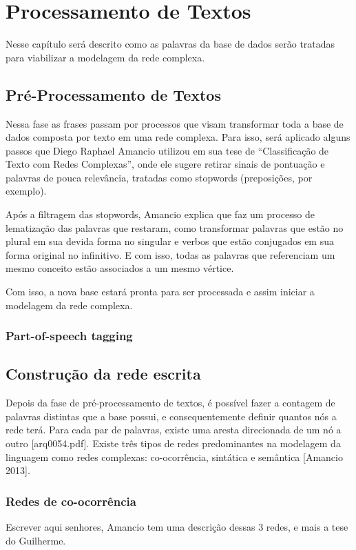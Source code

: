 \documentclass[xindy,rascunho]{fei}
\begin{document}
\chapter{Processamento de Textos}
Nesse capítulo será descrito como as palavras da base de dados serão tratadas para viabilizar a modelagem da rede complexa. 

\section{Pré-Processamento de Textos}
Nessa fase as frases passam por processos que visam transformar toda a base de dados composta por texto em uma rede complexa. Para isso, será aplicado alguns passos que Diego Raphael Amancio utilizou em sua tese de “Classificação de Texto com Redes Complexas”, onde ele sugere retirar sinais de pontuação e palavras de pouca relevância, tratadas como stopwords (preposições, por exemplo). 

Após a filtragem das stopwords, Amancio explica que faz um processo de lematização das palavras que restaram, como transformar palavras que estão no plural em sua devida forma no singular e verbos que estão conjugados em sua forma original no infinitivo. E com isso, todas as palavras que referenciam um mesmo conceito estão associados a um mesmo vértice.

Com isso, a nova base estará pronta para ser processada e assim iniciar a modelagem da rede complexa.

\subsection{Part-of-speech tagging}

\section{Construção da rede escrita}
Depois da fase de pré-processamento de textos, é possível fazer a contagem de palavras distintas que a base possui, e consequentemente definir quantos nós a rede terá. Para cada par de palavras, existe uma aresta direcionada de um nó a outro [arq0054.pdf]. Existe três tipos de redes predominantes na modelagem da linguagem como redes complexas: co-ocorrência, sintática e semântica [Amancio 2013].

\subsection{Redes de co-ocorrência}
Escrever aqui senhores, Amancio tem uma descrição dessas 3 redes, e mais a tese do Guilherme.
\end{document}
